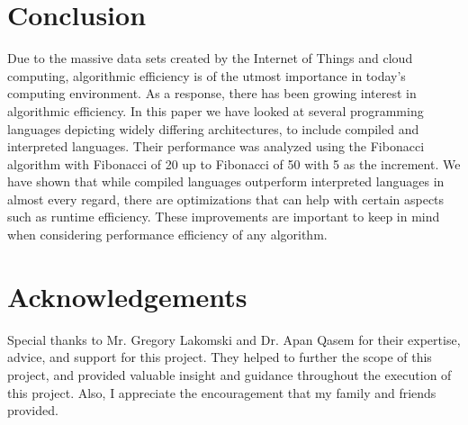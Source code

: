 \documentclass{sig-alternate}
\begin{document}
\section{Conclusion}

Due to the massive data sets created by the Internet of Things and cloud computing, algorithmic efficiency is of the utmost importance in today's computing environment. As a response, there has been growing interest in algorithmic efficiency. In this paper we have looked at several programming languages depicting widely differing architectures, to include compiled and interpreted languages. Their performance was analyzed using the Fibonacci algorithm with Fibonacci of 20 up to Fibonacci of 50 with 5 as the increment. We have shown that while compiled languages outperform interpreted languages in almost every regard, there are optimizations that can help with certain aspects such as runtime efficiency. These improvements are important to keep in mind when considering performance efficiency of any algorithm.


\section{Acknowledgements}
Special thanks to Mr. Gregory Lakomski and Dr. Apan Qasem for their expertise, advice, and support for this project. They helped to further the scope of this project, and provided valuable insight and guidance throughout the execution of this project. Also, I appreciate the encouragement that my family and friends provided.







\end{document}
